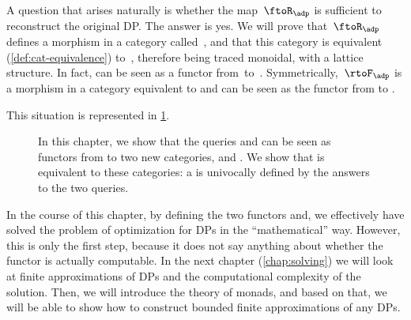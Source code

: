 A question that arises naturally is whether the map~$\ftoR_\adp$ is sufficient to reconstruct the original DP.
The answer is yes.
We will prove that~$\ftoR_\adp$ defines a morphism in a category called~\UPos, and that this category is equivalent (\cref{def:cat-equivalence}) to~\DP, therefore being traced monoidal, with a lattice structure.
In fact, \FixFunMinRes can be seen as a functor from~\DP to~\UPos.
Symmetrically,~$\rtoF_\adp$ is a morphism in a category \LPos equivalent to \DP and \FixResMaxFun can be seen as the functor from \DP to \LPos.

This situation is represented in \cref{fig:upos_lpos_dp}.

\begin{figure}[tbh]
    \centering
    \caption{In this chapter, we show that the queries \FixResMaxFun and \FixFunMinRes
        can be seen as functors from \DP to two new categories, \UPos and \LPos.
        We show that \DP is equivalent to these categories: a \DP is univocally
        defined by the answers to the two queries.
    }
    \label{fig:upos_lpos_dp}
\end{figure}

In the course of this chapter, by defining the two functors \FixFunMinRes and\linebreak[0] \FixResMaxFun, we effectively have solved the problem of optimization for DPs in the ``mathematical'' way.
However, this is only the first step, because it does not say anything about whether the functor is actually computable.
In the next chapter (\cref{chap:solving}) we will look at finite approximations of DPs and the computational complexity of the solution.
Then, we will introduce the theory of monads, and based on that, we will be able to show how to construct bounded finite approximations of any DPs.
